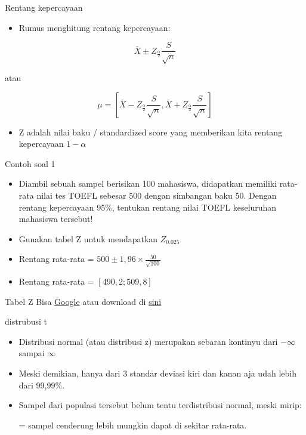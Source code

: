 \documentclass[
  ignorenonframetext,
]{beamer}
\providecommand{\tightlist}{%
  \setlength{\itemsep}{0pt}\setlength{\parskip}{0pt}}\usepackage{longtable,booktabs,array}
\begin{document}
\begin{frame}{Rentang kepercayaan}
\label{rentang-kepercayaan-1}
\begin{itemize}
\tightlist
\item
  Rumus menghitung rentang kepercayaan:
\end{itemize}

\[
\bar{X} \pm Z_{\frac{\alpha}{2}} \frac{S}{\sqrt{n}}
\]

atau

\[
\mu=\left[ \bar{X}-Z_{\frac{\alpha}{2}} \frac{S}{\sqrt{n}}, \bar{X}+Z_{\frac{\alpha}{2}}\frac{S}{\sqrt{n}}\right]
\]

\begin{itemize}
\tightlist
\item
  Z adalah nilai baku / standardized score yang memberikan kita rentang
  kepercayaan \(1-\alpha\)
\end{itemize}
\end{frame}

\begin{frame}{Contoh soal 1}
\label{contoh-soal-1-1}
\begin{itemize}[<+->]
\item
  Diambil sebuah sampel berisikan 100 mahasiswa, didapatkan memiliki
  rata-rata nilai tes TOEFL sebesar 500 dengan simbangan baku 50. Dengan
  rentang kepercayaan 95\%, tentukan rentang nilai TOEFL keseluruhan
  mahasiswa tersebut!
\item
  Gunakan tabel Z untuk mendapatkan \(Z_{0.025}\)
\item
  Rentang rata-rata = \(500 \pm 1,96\times\frac{50}{\sqrt{100}}\)
\item
  Rentang rata-rata = \(\left[490,2;509,8\right]\)
\end{itemize}
\end{frame}

\begin{frame}{Tabel Z}
\label{tabel-z}
Bisa
\href{https://www.google.com/search?client=firefox-b-d&q=z+score+table}{Google}
atau download di
\href{https://drive.google.com/file/d/1ywI58hnM8p0ZyFV7B9rCOosk72iCGguq/view?usp=sharing}{sini}
\end{frame}

\begin{frame}{distrubusi t}
\label{distrubusi-t}
\begin{itemize}
\item
  Distribusi normal (atau distribusi z) merupakan sebaran kontinyu dari
  \(-\infty\) sampai \(\infty\)
\item
  Meski demikian, hanya dari 3 standar deviasi kiri dan kanan aja udah
  lebih dari 99,99\%.
\item
  Sampel dari populasi tersebut belum tentu terdistribusi normal, meski
  mirip:

  = sampel cenderung lebih mungkin dapat di sekitar rata-rata.
\end{itemize}
\end{frame}
\end{document}
